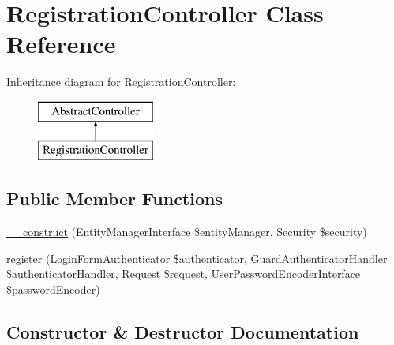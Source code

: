 \hypertarget{class_app_1_1_controller_1_1_registration_controller}{}\section{Registration\+Controller Class Reference}
\label{class_app_1_1_controller_1_1_registration_controller}
Inheritance diagram for Registration\+Controller\+:\begin{figure}[H]
\begin{center}
\leavevmode
\includegraphics[height=2.000000cm]{class_app_1_1_controller_1_1_registration_controller}
\end{center}
\end{figure}
\subsection*{Public Member Functions}
\begin{DoxyCompactItemize}
\item 
\mbox{\hyperlink{class_app_1_1_controller_1_1_registration_controller_a8c263aa27458273b8a880e117bc5aca1}{\+\_\+\+\_\+construct}} (Entity\+Manager\+Interface \$entity\+Manager, Security \$security)
\item 
\mbox{\hyperlink{class_app_1_1_controller_1_1_registration_controller_a768fa858afba91bb453ab2140fafda1d}{register}} (\mbox{\hyperlink{class_app_1_1_security_1_1_login_form_authenticator}{Login\+Form\+Authenticator}} \$authenticator, Guard\+Authenticator\+Handler \$authenticator\+Handler, Request \$request, User\+Password\+Encoder\+Interface \$password\+Encoder)
\end{DoxyCompactItemize}


\subsection{Constructor \& Destructor Documentation}
\mbox{\label{class_app_1_1_controller_1_1_registration_controller_a8c263aa27458273b8a880e117bc5aca1}} 
